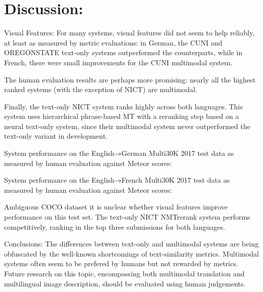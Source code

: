\documentclass[presentation]{beamer}
\begin{document}
\section{Discussion:}
\label{sec:org791ddaa}

\begin{frame}[label={sec:orgb8d9b70}]{Visual Features:}
For many systems, visual features did not seem to help reliably, at least as measured by metric evaluations: in German, the CUNI and OREGONSTATE text-only systems outperformed the counterparts, while in French, there were small improvements for the CUNI multimodal system.

The human evaluation results are perhaps more promising: nearly all the highest ranked systems (with the exception of NICT) are multimodal.

Finally, the text-only NICT system ranks highly across both languages. This system uses hierarchical phrase-based MT with a reranking step based on a neural text-only system, since their multimodal system never outperformed the text-only variant in development.
\end{frame}

\begin{frame}[label={sec:org630ca76}]{}
System performance on the English→German Multi30K 2017 test data as measured by human evaluation against Meteor scores:


System performance on the English→French Multi30K 2017 test data as measured by human
evaluation against Meteor scores:
\end{frame}



\begin{frame}[label={sec:orgb5348fc}]{Ambiguous COCO dataset}
it is unclear whether visual features improve performance on this test set. The text-only NICT NMTrerank system performs competitively, ranking in the top three submissions for both languages.
\end{frame}


\begin{frame}[label={sec:org1c9053a}]{Conclusions:}
The differences between text-only and multimodal systems are being obfuscated by the well-known shortcomings of text-similarity metrics. Multimodal systems often seem to be prefered by humans but not rewarded by metrics. Future research on this topic, encompassing both multimodal translation and multilingual image description, should be evaluated using human judgements.




\end{frame}
\end{document}
